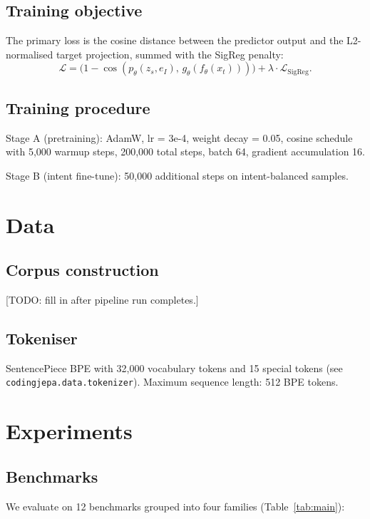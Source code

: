 \documentclass[10pt]{article}
\begin{document}
\subsection{Training objective}

The primary loss is the cosine distance between the predictor output and the L2-normalised
target projection, summed with the SigReg penalty:
\[
  \mathcal{L} = \bigl(1 - \cos(p_\theta(z_s, e_I),\, g_\theta(f_\theta(x_t)))\bigr)
              + \lambda \cdot \mathcal{L}_{\text{SigReg}}.
\]

\subsection{Training procedure}

Stage A (pretraining): AdamW, lr = 3e-4, weight decay = 0.05, cosine schedule with 5,000
warmup steps, 200,000 total steps, batch 64, gradient accumulation 16.

Stage B (intent fine-tune): 50,000 additional steps on intent-balanced samples.

\section{Data}
\label{sec:data}

\subsection{Corpus construction}

[TODO: fill in after pipeline run completes.]

\subsection{Tokeniser}

SentencePiece BPE with 32,000 vocabulary tokens and 15 special tokens (see
\texttt{codingjepa.data.tokenizer}). Maximum sequence length: 512 BPE tokens.

\section{Experiments}
\label{sec:experiments}

\subsection{Benchmarks}

We evaluate on 12 benchmarks grouped into four families (Table~\ref{tab:main}):
\end{document}
